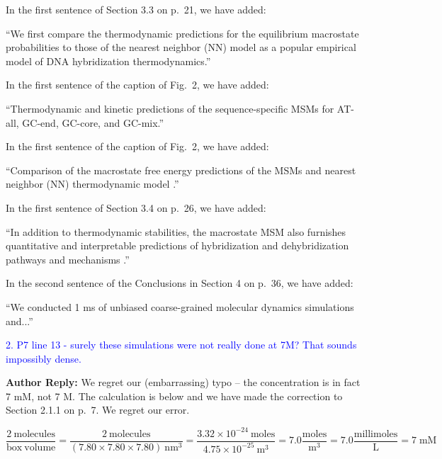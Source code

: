 \documentclass[11pt,a4paper]{letter} %
\newcommand*{\rood}[1]{{\color{red}{#1}}}
\begin{document}
In the first sentence of Section 3.3 on p.~21, we have added:

``We first compare the thermodynamic predictions for the equilibrium macrostate probabilities \rood{made by the MSM models fitted at the sequence melting temperatures} to those of the nearest neighbor (NN) model as a popular empirical model of DNA hybridization thermodynamics.''

In the first sentence of the caption of Fig.~2, we have added:

``Thermodynamic and kinetic predictions of the sequence-specific MSMs \rood{fitted at the sequence melting temperatures} for AT-all, GC-end, GC-core, and GC-mix.''

In the first sentence of the caption of Fig.~2, we have added:

``Comparison of the macrostate free energy predictions of the MSMs and nearest neighbor (NN) thermodynamic model \rood{at the sequence melting temperatures}.''

In the first sentence of Section 3.4 on p.~26, we have added:

``In addition to thermodynamic stabilities, the macrostate MSM also furnishes quantitative and interpretable predictions of hybridization and dehybridization pathways and mechanisms \rood{at the sequence melting temperatures}.''

In the second sentence of the Conclusions in Section 4 on p.~36, we have added:

``We conducted 1 ms of unbiased coarse-grained molecular dynamics simulations \rood{at the melting temperature of each sequence} and...''






\textcolor{blue}{2. P7 line 13 - surely these simulations were not really done at 7M? That sounds impossibly dense.}

\textbf{Author Reply:}   We regret our (embarrassing) typo -- the concentration is in fact 7 mM, not 7 M. The calculation is below and we have made the correction to Section 2.1.1 on p.~7. We regret our error.

\begin{equation}\label{}
\frac{2 \mathrm{\:molecules}}{\mathrm{box\:volume}} = \frac{2 \mathrm{\:molecules}}{(7.80 \times 7.80 \times 7.80) \mathrm{\:nm}^3} = \frac{3.32 \times 10^{-24} \mathrm{\:moles}}{4.75 \times 10^{-25} \mathrm{\:m}^3} = 7.0 \frac{\mathrm{moles}}{\mathrm{m}^3} = 7.0 \frac{\mathrm{millimoles}}{\mathrm{L}} = 7 \; \mathrm{mM}
\end{equation}
\end{document}
